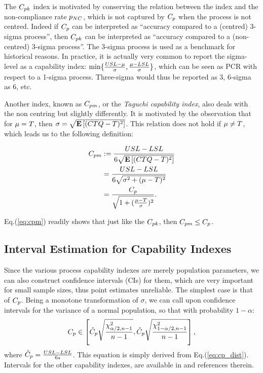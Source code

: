 The $C_{pk}$ index is motivated by conserving the relation between the index and the non-compliance rate $p_{NC}$, which is not captured by $C_p$ when the process is not centred. 
Indeed if $C_p$ can be interpreted as ``accuracy compared to a (centred) 3-sigma process'', then $C_{pk}$ can be interpreted as ``accuracy compared to a (non-centred) 3-sigma process''.
The 3-sigma process is used as a benchmark for historical reasons. 
In practice, it is actually very common to report the sigma-level as a capability index: $\min\{ \frac{USL-\mu}{\sigma},\frac{\mu-LSL}{\sigma} \}$, which can be seen as PCR with respect to a 1-sigma process.
Three-sigma would thus be reported as $3$, 6-sigma as $6$, etc.


Another index, known as $\cpm$, or the \emph{Taguchi capability index}, also deals with the non centring but slightly differently. 
It is motivated by the observation that for $\mu=T$, then $\sigma=\sqrt{\mathbf{E}\left[ (CTQ-T)^2 \right]}$. This relation does not hold if $\mu \not=T$, which leads us to the following definition:
\begin{definition}[$\cpm$]
\begin{align}
		C_{pm} &:= \frac{USL-LSL}{6 \sqrt{\mathbf{E}\left[ (CTQ-T)^2 \right]}} \\
		&= 	\frac{USL-LSL}{6 \sqrt{\sigma^2+(\mu-T)^2}} \\ 
		&= \frac{C_p}{\sqrt{1+(\frac{\mu-T}{\sigma})^2}}. \label{eq:cpm}
\end{align}
\end{definition}
Eq.(\ref{eq:cpm}) readily shows that just like the $C_{pk}$, then $C_{pm} \leq C_p$. 








\subsection{Interval Estimation for Capability Indexes}
Since the various process capability indexes are merely population parameters, we can also construct confidence intervals (CIs) for them, which are very important for small sample sizes, thus point estimates unreliable.
The simplest case is that of $C_p$. Being a monotone transformation of $\sigma$, we can call upon confidence intervals for the variance of a normal population, so that with probability $1-\alpha$:
\begin{align}
\label{eq:ci_for_cp}
	C_p \in \left[ 
		\hat{C}_p \sqrt{\frac{\chi^2_{\alpha/2,n-1}}{n-1}},
		\hat{C}_p \sqrt{\frac{\chi^2_{1-\alpha/2,n-1}}{n-1}}
	\right],
\end{align}
where $\hat{C}_p = \frac{USL-LSL}{6 s}$.
This equation is simply derived from Eq.(\ref{eq:cp_dist}).
Intervals for the other capability indexes, are available in \cite{montgomery_introduction_2007} and references therein. 




